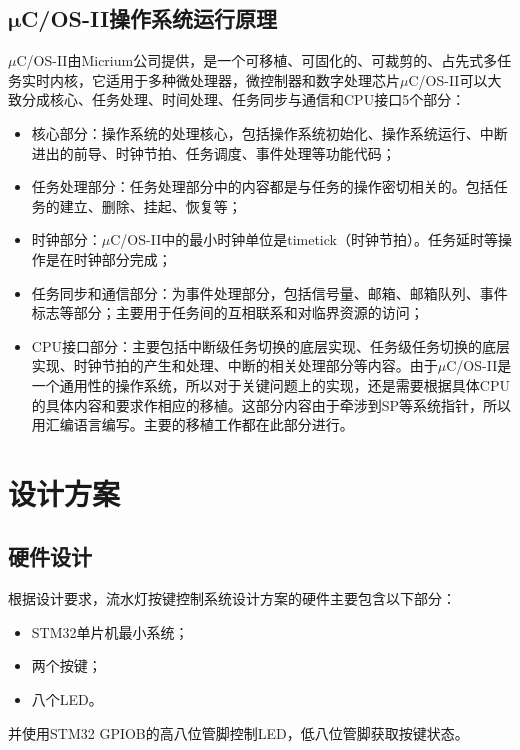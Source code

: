 \documentclass[a4paper]{ctexart}
\begin{document}
\begin{spacing}{1.3}
	\subsection{$\bm\mu$C/OS-II操作系统运行原理}
	$\mu$C/OS-II由Micrium公司提供，是一个可移植、可固化的、可裁剪的、占先式多任务实时内核，它适用于多种微处理器，微控制器和数字处理芯片$\mu$C/OS-II可以大致分成核心、任务处理、时间处理、任务同步与通信和CPU接口5个部分：
	\begin{itemize}
		\item 核心部分：操作系统的处理核心，包括操作系统初始化、操作系统运行、中断进出的前导、时钟节拍、任务调度、事件处理等功能代码；
		\item 任务处理部分：任务处理部分中的内容都是与任务的操作密切相关的。包括任务的建立、删除、挂起、恢复等；
		\item 时钟部分：$\mu$C/OS-II中的最小时钟单位是timetick（时钟节拍）。任务延时等操作是在时钟部分完成；
		\item 任务同步和通信部分：为事件处理部分，包括信号量、邮箱、邮箱队列、事件标志等部分；主要用于任务间的互相联系和对临界资源的访问；
		\item CPU接口部分：主要包括中断级任务切换的底层实现、任务级任务切换的底层实现、时钟节拍的产生和处理、中断的相关处理部分等内容。由于$\mu$C/OS-II是一个通用性的操作系统，所以对于关键问题上的实现，还是需要根据具体CPU的具体内容和要求作相应的移植。这部分内容由于牵涉到SP等系统指针，所以用汇编语言编写。主要的移植工作都在此部分进行。
	\end{itemize}

	\section{设计方案}
	\subsection{硬件设计}\label{硬件设计}
	根据设计要求，流水灯按键控制系统设计方案的硬件主要包含以下部分：
	\begin{itemize}
		\item STM32单片机最小系统；
		\item 两个按键；
		\item 八个LED。
	\end{itemize}
	
	并使用STM32 GPIOB的高八位管脚控制LED，低八位管脚获取按键状态。


\end{spacing}
\end{document}
